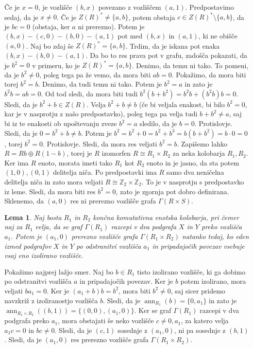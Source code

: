 \documentclass[a4paper, 12pt]{amsart}
\theoremstyle{definition} %
\theoremstyle{plain} %
\newtheorem{lema}[definicija]{Lema}
\newcommand{\Z}{\mathbb Z}
\DeclareMathOperator{\ann}{ann}
\begin{document}
Če je $x=0$, je vozlišče $(b,x)$ povezano z vozliščem $(a,1)$. Predpostavimo sedaj, da je $x \neq 0$.
Če je $Z(R)^* \neq \{a,b\}$, potem obstaja $c\in Z(R)^* \setminus \{a,b\}$, da je $bc=0$ (obstaja, ker $a$ ni prerezno). Potem je $(b,x) - (c,0) - (b,0) - (a,1)$ pot med $(b,x)$ in $(a,1)$, ki ne obišče $(a,0)$. Naj bo zdaj še $Z(R)^* = \{a,b\}$. Trdim, da je iskana pot enaka $(b,x) - (b,0) - (a,1)$. Da bo to res prava pot v grafu, zadošča pokazati, da je $b^2 = 0$ v primeru, ko je $Z(R)^* = \{a,b\}$. Denimo, da temu ni tako. To pomeni, da je $b^2 \neq 0$, poleg tega pa že vemo, da mora biti $ab=0$. Pokažimo, da mora biti torej $b^2  = b$. Denimo, da tudi temu ni tako. Potem je $b^2 = a$ in zato je $b^2 b = a b = 0$. Od tod sledi, da mora biti tudi $b^2 (b+b^2) = b^2 b + (b^2 b)b  = 0$. Sledi, da je $b^2 + b\in Z(R)$. Velja $b^2 + b\neq b$ (če bi veljala enakost, bi bilo $b^2 = 0$, kar je v nasprotju z našo predpostavko), poleg tega pa velja tudi $b+b^2 \neq a$, saj bi iz te enakosti ob upoštevanju zveze $b^2 = a$ sledilo, da je $b = 0$. Protislovje. Sledi, da je $0=b^2 + b\neq b $. Potem je $b^2 = b^2 + 0 = b^2 + b^3 = b(b+b^2) = b\cdot 0 = 0$, torej $b^2 = 0$. Protislovje. Sledi, da mora res veljati $b^2 = b$. Zapišemo lahko $R=Rb \oplus R(1-b)$, torej je $R$ izomorfen $R\cong R_1\times R_2$ za neka kolobarja $R_1,R_2$. Ker ima $R$ enoto, morata imeti tako $R_1$ kot $R_2$ enoto in je jasno, da sta potem $(1,0),(0,1)$ delitelja niča. Po predpostavki ima $R$ samo dva neničelna delitelja niča in zato mora veljati $R\cong \Z_2 \times \Z_2$. To je v nasprotju s predpostavko iz leme. Sledi, da mora biti res $b^2 = 0$, zato je zgornja pot dobro definirana. Sklenemo, da $(a,0)$ res ni prerezno vozlišče grafa $\Gamma(R\times S)$.
\endproof

\begin{lema}
\label{cutVertexProduct}
Naj bosta $R_1$ in $ R_2$ končna komutativna enotska kolobarja, pri čemer naj za $R_1$ velja, da se graf $\Gamma(R_1)$ razcepi v dva podgrafa $X$ in $Y$ preko vozlišča $a_1$. Potem je $(a_1,0) $ prerezno vozlišče grafa $\Gamma(R_1 \times R_2)$ natanko tedaj, ko eden izmed podgrafov $X$ in $Y$ po odstranitvi vozlišča $a_1$ in pripadajočih povezav  vsebuje vsaj eno izolirano vozlišče.
\end{lema}

\proof
Pokažimo najprej lažjo smer. Naj bo $b\in R_1$ tisto izolirano vozlišče, ki ga dobimo po odstranitvi vozlišča $a$ in pripadajočih povezav. Ker je $b$ potem izolirano, mora veljati $ba_1 = 0$. Ker je $(a_1 + b)b = b^2$, mora biti $b^2\neq 0$, saj sicer pridemo navzkriž z izoliranostjo vozlišča $b$. Sledi, da je $\ann_{R_1}(b) = \{0,a_1\}$ in zato je $\ann_{R_1\times R_2}((b,1)) = \{(0,0),(a_1,0)\}$. Ker se graf $\Gamma(R_1)$ razcepi v dva podgrafa preko $a_1$, mora obstajati še neko vozlišče $c\neq 0,a_1$, za katero velja $a_1 c = 0$ in $bc\neq 0$. Sledi, da je $(c,1)$ sosednje z $(a_1,0)$, ni pa sosednje z $(b,1)$. Sledi, da je $(a_1,0)$ res prerezno vozlišče grafa $\Gamma(R_1 \times R_2)$.
\end{document}
